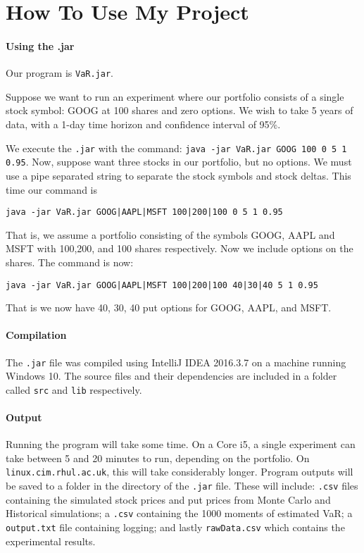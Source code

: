 \documentclass[../Dissertation.tex]{subfiles}
\begin{document}
\section{How To Use My Project}

\paragraph{Using the .jar}

Our program is \lstinline|VaR.jar|.

Suppose we want to run an experiment where our portfolio consists of a single stock symbol: GOOG at 100 shares and zero options.
We wish to take 5 years of data, with a 1-day time horizon and confidence interval of 95\%.

We execute the \lstinline|.jar| with the command: \lstinline|java -jar VaR.jar GOOG 100 0 5 1 0.95|.
Now, suppose want three stocks in our portfolio, but no options. 
We must use a pipe separated string to separate the stock symbols and stock deltas.
This time our command is 
\begin{lstlisting}[numbers=none]
java -jar VaR.jar GOOG|AAPL|MSFT 100|200|100 0 5 1 0.95
\end{lstlisting}
That is, we assume a portfolio consisting of the symbols GOOG, AAPL and MSFT with 100,200, and 100 shares respectively.
Now we include options on the shares.
The command is now:
\begin{lstlisting}[numbers=none]
java -jar VaR.jar GOOG|AAPL|MSFT 100|200|100 40|30|40 5 1 0.95
\end{lstlisting}
That is we now have 40, 30, 40 put options for GOOG, AAPL, and MSFT.

\paragraph{Compilation}

The \lstinline|.jar| file was compiled using IntelliJ IDEA 2016.3.7 on a machine running Windows 10.
The source files and their dependencies are included in a folder called \lstinline|src| and \lstinline|lib| respectively.

\paragraph{Output}

Running the program will take some time.
On a Core i5, a single experiment can take between 5 and 20 minutes to run, depending on the portfolio.
On \lstinline|linux.cim.rhul.ac.uk|, this will take considerably longer.
Program outputs will be saved to a folder in the directory of the \lstinline|.jar| file.
These will include: 
\lstinline|.csv| files containing the simulated stock prices and put prices from Monte Carlo and Historical simulations;
a \lstinline|.csv| containing the 1000 moments of estimated VaR;
a \lstinline|output.txt| file containing logging;
and lastly \lstinline|rawData.csv| which contains the experimental results.
\end{document}
